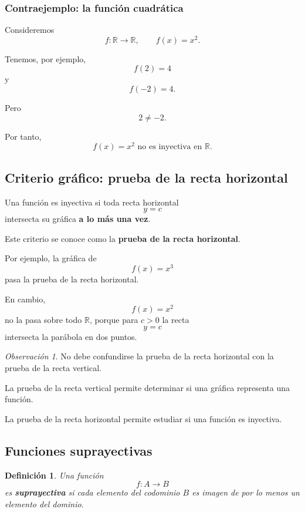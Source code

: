 \documentclass[12pt]{article}
\newtheorem{definicion}{Definición}[section]
\theoremstyle{remark}
\newtheorem{observacion}{Observación}[section]
\begin{document}
\subsubsection{Contraejemplo: la función cuadrática}

Consideremos
\[
f:\mathbb{R}\longrightarrow\mathbb{R},
\qquad
f(x)=x^2.
\]

Tenemos, por ejemplo,
\[
f(2)=4
\]
y
\[
f(-2)=4.
\]

Pero
\[
2\neq-2.
\]

Por tanto,
\[
\boxed{f(x)=x^2\text{ no es inyectiva en }\mathbb{R}.}
\]

\subsection{Criterio gráfico: prueba de la recta horizontal}

Una función es inyectiva si toda recta horizontal
\[
y=c
\]
intersecta su gráfica \textbf{a lo más una vez}.

Este criterio se conoce como la
\textbf{prueba de la recta horizontal}.

Por ejemplo, la gráfica de
\[
f(x)=x^3
\]
pasa la prueba de la recta horizontal.

En cambio,
\[
f(x)=x^2
\]
no la pasa sobre todo \(\mathbb{R}\), porque para \(c>0\)
la recta
\[
y=c
\]
intersecta la parábola en dos puntos.

\begin{observacion}
No debe confundirse la prueba de la recta horizontal con la prueba
de la recta vertical.

La prueba de la recta vertical permite determinar si una gráfica
representa una función.

La prueba de la recta horizontal permite estudiar si una función
es inyectiva.
\end{observacion}

\subsection{Funciones suprayectivas}

\begin{definicion}
Una función
\[
f:A\longrightarrow B
\]
es \textbf{suprayectiva} si cada elemento del codominio \(B\)
es imagen de por lo menos un elemento del dominio.
\end{definicion}
\end{document}
